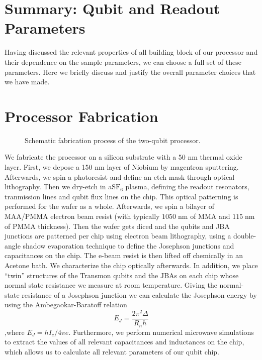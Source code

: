 \section{Summary: Qubit and Readout Parameters}

Having discussed the relevant properties of all building block of our processor and their dependence on the sample parameters, we can choose a full set of these parameters. Here we briefly discuss and justify the overall parameter choices that we have made.

\section{Processor Fabrication}

\begin{figure}[ht!]
	\centering
	\caption[]{Schematic  fabrication process of the two-qubit processor.}
	\label{fig:processor_fabrication}
\end{figure}

We fabricate the processor on a silicon substrate with a 50 nm thermal oxide layer. First, we depose a 150 nm layer of Niobium by magentron sputtering. Afterwards, we spin a photoresist and define an etch mask through optical lithography. Then we dry-etch in a$\mathrm{SF}_6$ plasma, defining the readout resonators, tranmission lines and qubit flux lines on the chip. This optical patterning is performed for the wafer as a whole. Afterwards, we spin a bilayer of MAA/PMMA electron beam resist (with typically $1050\;\mathrm{nm}$ of MMA and $115\;\mathrm{nm}$ of PMMA thickness). Then the wafer gets diced and the qubits and JBA junctions are patterned per chip using electron beam lithography, using a double-angle shadow evaporation technique to define the Josephson junctions and capacitances on the chip. The e-beam resist is then lifted off chemically in an Acetone bath. We characterize the chip optically afterwards. In addition, we place ``twin'' structures of the Transmon qubits and the JBAs on each chip whose normal state resistance we measure at room temperature. Giving the normal-state resistance of a Josephson junction we can calculate the Josephson energy by using the Ambegaokar-Baratoff relation
%
\begin{equation}
E_J = \frac{2\pi^2 \Delta}{R_n h}
\end{equation}
%
,where $E_J = h I_c / 4\pi e$. Furthermore, we perform numerical microwave simulations to extract the values of all relevant capacitances and inductances on the chip, which allows us to calculate all relevant parameters of our qubit chip.

